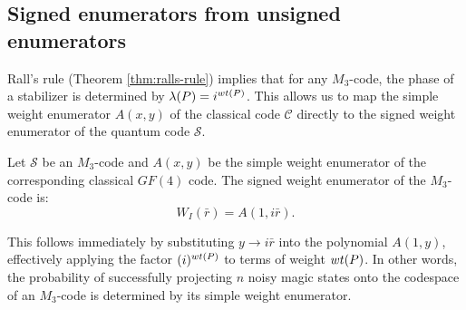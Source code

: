 \documentclass[11pt]{article}
\def\ket#1{\mathinner{|{#1}\rangle}}
\newcommand{\wt}{{\rm{wt}} }
\begin{document}


\subsection{Signed enumerators from unsigned enumerators}
\label{simple-from-signed}
Rall's rule (Theorem \ref{thm:ralls-rule}) implies that for any $M_3$-code, the phase of a stabilizer is determined by $\lambda(P) = i^{\wt(P)}$. This allows us to map the simple weight enumerator $A(x,y)$ of the classical code $\mathcal C$ directly to the signed weight enumerator of the quantum code $\mathcal S$.

\begin{corollary}
Let $\mathcal S$ be an $M_3$-code and $A(x,y)$ be the simple weight enumerator of the corresponding classical $GF(4)$ code. The signed weight enumerator of the $M_3$-code is:
\begin{equation}
    W_I(\bar{r}) = A(1, i\bar{r}).
\end{equation}
\end{corollary}
\noindent This follows immediately by substituting $y \to i\bar{r}$ into the polynomial $A(1,y)$, effectively applying the factor $(i)^{\wt(P)}$ to terms of weight $\wt(P)$. In other words,  the probability of successfully projecting $n$ noisy magic states onto the codespace of an $M_3$-code is determined by its simple weight enumerator. 
\end{document}
